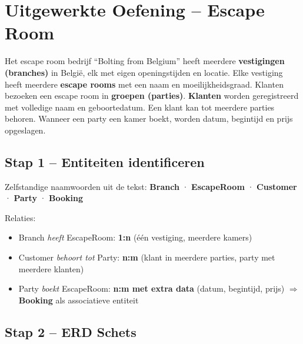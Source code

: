 \documentclass[a4paper,11pt]{article}
\begin{document}
\section{Uitgewerkte Oefening -- Escape Room}

\begin{oefening}
Het escape room bedrijf ``Bolting from Belgium'' heeft meerdere \textbf{vestigingen (branches)} in België, elk met eigen openingstijden en locatie. Elke vestiging heeft meerdere \textbf{escape rooms} met een naam en moeilijkheidsgraad. Klanten bezoeken een escape room in \textbf{groepen (parties)}. \textbf{Klanten} worden geregistreerd met volledige naam en geboortedatum. Een klant kan tot meerdere parties behoren. Wanneer een party een kamer boekt, worden datum, begintijd en prijs opgeslagen.
\end{oefening}

\subsection{Stap 1 -- Entiteiten identificeren}

Zelfstandige naamwoorden uit de tekst:
\textbf{Branch} · \textbf{EscapeRoom} · \textbf{Customer} · \textbf{Party} · \textbf{Booking}

Relaties:
\begin{itemize}
  \item Branch \emph{heeft} EscapeRoom: \textbf{1:n} (één vestiging, meerdere kamers)
  \item Customer \emph{behoort tot} Party: \textbf{n:m} (klant in meerdere parties, party met meerdere klanten)
  \item Party \emph{boekt} EscapeRoom: \textbf{n:m met extra data} (datum, begintijd, prijs) $\Rightarrow$ \textbf{Booking} als associatieve entiteit
\end{itemize}

\subsection{Stap 2 -- ERD Schets}
\end{document}
